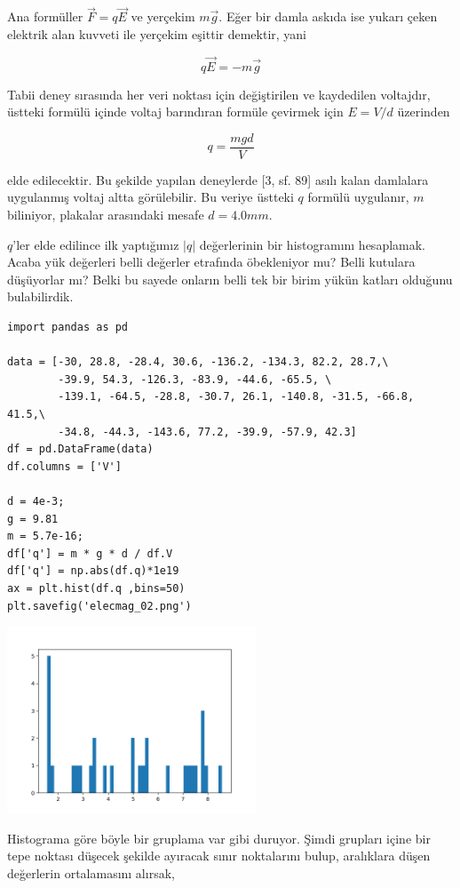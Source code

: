 \documentclass[12pt,fleqn]{article}\usepackage{../../common}
\begin{document}
Ana formüller $\vec{F} = q \vec{E}$ ve yerçekim $m\vec{g}$. Eğer bir damla
askıda ise yukarı çeken elektrik alan kuvveti ile yerçekim eşittir
demektir, yani

$$ q \vec{E} = -m\vec{g}$$

Tabii deney sırasında her veri noktası için değiştirilen ve kaydedilen
voltajdır, üstteki formülü içinde voltaj barındıran formüle çevirmek için
$E = V / d$ üzerinden

$$ q = \frac{m g d}{V}$$

elde edilecektir. Bu şekilde yapılan deneylerde [3, sf. 89] asılı kalan
damlalara uygulanmış voltaj altta görülebilir. Bu veriye üstteki $q$
formülü uygulanır, $m$ biliniyor, plakalar arasındaki mesafe $d = 4.0 mm$.

$q$'ler elde edilince ilk yaptığımız $|q|$ değerlerinin bir histogramını
hesaplamak. Acaba yük değerleri belli değerler etrafında öbekleniyor mu?
Belli kutulara düşüyorlar mı? Belki bu sayede onların belli tek bir birim
yükün katları olduğunu bulabilirdik.

\begin{verbatim}
import pandas as pd

data = [-30, 28.8, -28.4, 30.6, -136.2, -134.3, 82.2, 28.7,\
        -39.9, 54.3, -126.3, -83.9, -44.6, -65.5, \
        -139.1, -64.5, -28.8, -30.7, 26.1, -140.8, -31.5, -66.8, 41.5,\
        -34.8, -44.3, -143.6, 77.2, -39.9, -57.9, 42.3]
df = pd.DataFrame(data)
df.columns = ['V']

d = 4e-3;
g = 9.81
m = 5.7e-16;
df['q'] = m * g * d / df.V
df['q'] = np.abs(df.q)*1e19
ax = plt.hist(df.q ,bins=50)
plt.savefig('elecmag_02.png')
\end{verbatim}

\includegraphics[width=20em]{elecmag_02.png}

Histograma göre böyle bir gruplama var gibi duruyor. Şimdi grupları içine
bir tepe noktası düşecek şekilde ayıracak sınır noktalarını bulup,
aralıklara düşen değerlerin ortalamasını alırsak,
\end{document}
